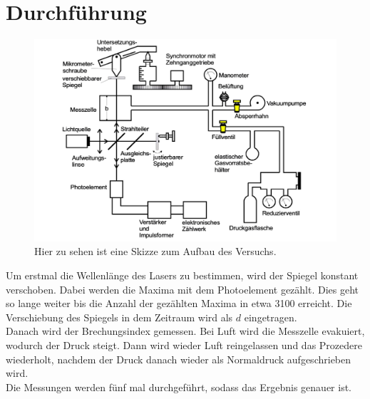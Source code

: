 \section{Durchführung}
\label{sec:Durchfuehrung}

\begin{figure}
    \centering
    \includegraphics[scale = 0.5]{content/Aufbau1.pdf}
    \caption{Hier zu sehen ist eine Skizze zum Aufbau des Versuchs.}
    \label{fig:Teiler}
\end{figure}

Um erstmal die Wellenlänge des Lasers zu bestimmen, wird der Spiegel konstant verschoben. Dabei werden die Maxima mit dem Photoelement gezählt. Dies geht so lange weiter bis die Anzahl der gezählten Maxima in etwa 3100 erreicht. Die Verschiebung des Spiegels in dem Zeitraum wird als \(d\) eingetragen.\\
Danach wird der Brechungsindex gemessen. Bei Luft wird die Messzelle evakuiert, wodurch der Druck steigt. Dann wird wieder Luft reingelassen und das Prozedere wiederholt, nachdem der Druck danach wieder als Normaldruck aufgeschrieben wird.\\
Die Messungen werden fünf mal durchgeführt, sodass das Ergebnis genauer ist.